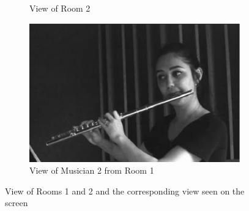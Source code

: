 \begin{figure}[t]
\begin{subfigure}[t]{.48\columnwidth}
		\caption{View of Room 2}
	\label{subfig:fs}
	\end{subfigure}
	\begin{subfigure}[t]{.48\columnwidth}
	\centering        
	\includegraphics[width=\textwidth]{img/fv.eps}
	\caption{View of Musician 2 from Room 1}
	\label{subfig:fv}
\end{subfigure}

	\quad 
	\caption{View of Rooms 1 and 2 and the corresponding view seen on the screen}\label{fig:afsv}

\end{figure}

